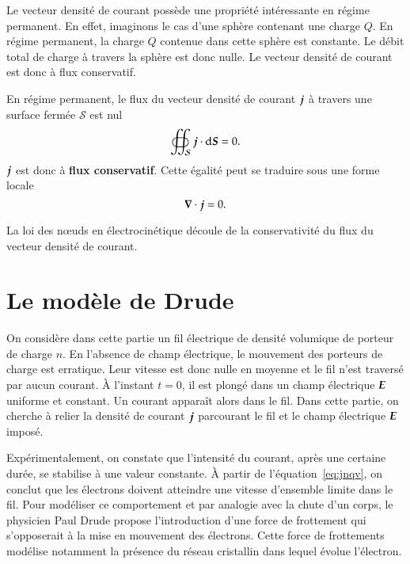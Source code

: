 Le vecteur densité de courant possède une propriété intéressante en régime 
permanent.
En effet, imaginons le cas d'une sphère contenant une charge $Q$. En régime permanent,
la charge $Q$ contenue dans cette sphère est constante. Le débit total de
charge à travers la sphère est donc nulle. Le vecteur densité de courant est donc 
à flux conservatif.

\begin{defn}
	En régime permanent, le flux du vecteur densité de courant $\vecj$
	à travers une surface fermée $\mathcal{S}$ est nul
	\begin{equation*}
		\oiint_\mathcal{S} \vecj \cdot \ds = 0.
	\end{equation*}
	$\vecj$ est donc à \textbf{flux conservatif}. Cette égalité peut se traduire
	sous une forme locale
	\begin{equation*}
		\grad \cdot \vecj = 0.
	\end{equation*}
\end{defn}

\begin{rema}
	La loi des n\oe{}uds en électrocinétique découle de la conservativité du
	flux du vecteur densité de courant.
\end{rema}

\section{Le modèle de Drude}
On considère dans cette partie un fil électrique de densité volumique
de porteur de charge $n$. En l'absence de champ électrique, le mouvement
des porteurs de charge est erratique. Leur vitesse est donc nulle en moyenne
et le fil n'est traversé par aucun courant. À l'instant $t=0$, il est plongé dans 
un champ électrique $\vece$ uniforme et constant. Un courant apparaît alors dans 
le fil. Dans cette partie, on cherche
à relier la densité de courant $\vecj$ parcourant le fil et le champ électrique 
$\vece$ imposé.

Expérimentalement, on constate que l'intensité du courant, après une certaine durée,
se stabilise à une valeur constante. 
À partir de l'équation~\ref{eq:jnqv}, on conclut que les 
électrons doivent atteindre une vitesse d'ensemble limite dans le fil. Pour modéliser 
ce comportement et par analogie avec la chute d'un corps, 
le physicien Paul Drude propose l'introduction d'une force de frottement 
qui s'opposerait à la mise en mouvement des électrons. Cette force de 
frottements modélise notamment la présence du réseau cristallin dans lequel évolue 
l'électron. 

